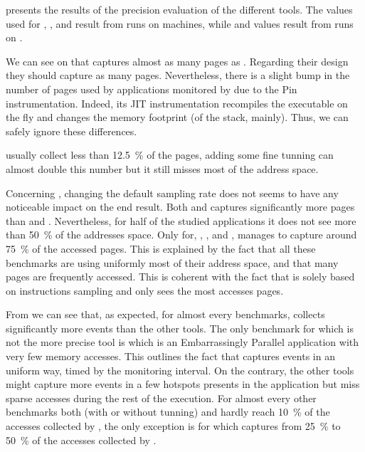  presents the results of the precision evaluation of the
different tools. The values used for \Mitos, \MitosTun, \Moca and
\TABARNAC result from runs on \Edel machines, while \MemProf and \MemProfTun values result from runs on
\Stremi.

We can see on  that \Moca captures almost as many pages as \TABARNAC.
Regarding their design they should capture as many pages. Nevertheless, there is a slight
bump in the number of pages used by applications monitored by \TABARNAC due to the Pin instrumentation.
Indeed, its JIT instrumentation recompiles the executable on the fly and changes the memory footprint
(of the stack, mainly). Thus, we can safely ignore these differences.

\Mitos usually collect less than \SI{12.5}{\%} of the pages, adding some fine tunning
can almost double this number but it still misses most of the address space.

Concerning \MemProf, changing the default sampling rate does not seems to
have any noticeable impact on the end result. Both \MemProf and \MemProfTun captures significantly more pages than
\Mitos and \MitosTun. Nevertheless, for half of the studied applications it does
not see more than \SI{50}{\%} of the addresses space. Only for, \BT, \LU, \SP and \UA,
\MemProf manages to capture around \SI{75}{\%} of the accessed pages. This is explained by the fact that all these
benchmarks are using uniformly most of their address space, and that many pages are frequently accessed.
This is coherent with the fact that \MemProf is solely based on instructions sampling and only sees the most accesses pages.

From  we can see that, as expected, for almost every benchmarks,
\Moca collects significantly more events than the other tools.  The only
benchmark for which \Moca is not the more precise tool is \EP which is an
Embarrassingly Parallel application with very few memory accesses.
This outlines the fact that \Moca captures events in an uniform way, timed by the monitoring interval.
On the contrary, the other tools might capture more events in a few hotspots presents in the application but miss
sparse accesses during the rest of the execution.
For almost
every other benchmarks both \Mitos (with or without tunning) and \MemProf
hardly reach \SI{10}{\%} of the accesses collected by \Moca, the only exception is
\DC for which \MemProf captures from \SI{25}{\%} to \SI{50}{\%} of the accesses
collected by \Moca.

